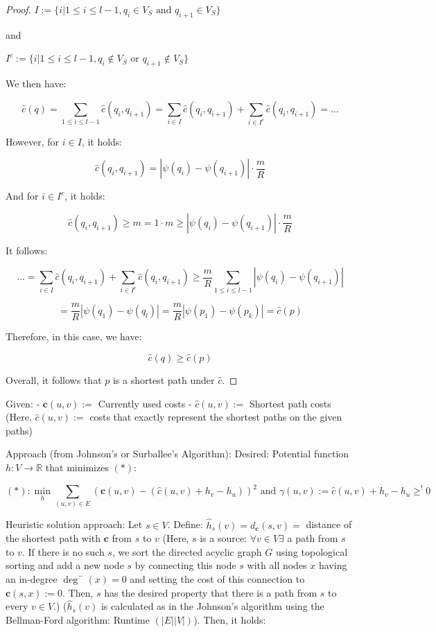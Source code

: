 \documentclass[11pt]{scrartcl}
\begin{document}
\begin{proof}
$I := \{i| 1 \le i \le l-1, q_i \in V_S \text{ and } q_{i+1} \in V_S\}$

and

$I^c := \{i| 1 \le i \le l-1, q_i \notin V_S \text{ or } q_{i+1} \notin V_S\}$

We then have:

\[
\hat{c}(q) = \sum_{1 \le i \le l-1} \hat{c}(q_i,q_{i+1}) = \sum_{i \in I} \hat{c}(q_i,q_{i+1})+\sum_{i \in I^c} \hat{c}(q_i,q_{i+1})=\ldots
\]

However, for $i \in I$, it holds:

\[
\hat{c}(q_i,q_{i+1}) = |\psi(q_i)-\psi(q_{i+1})| \cdot \frac{m}{R}
\]

And for $i \in I^c$, it holds:

\[
\hat{c}(q_i,q_{i+1}) \ge m = 1 \cdot m \ge |\psi(q_i)-\psi(q_{i+1})| \cdot \frac{m}{R}
\]

It follows:

\[
\ldots=\sum_{i \in I} \hat{c}(q_i,q_{i+1})+\sum_{i \in I^c} \hat{c}(q_i,q_{i+1}) \ge \frac{m}{R} \sum_{1 \le i \le l-1}{|\psi(q_i)-\psi(q_{i+1})|}
\]

\[
=\frac{m}{R} |\psi(q_1)-\psi(q_l)|=\frac{m}{R} |\psi(p_1)-\psi(p_k)| = \hat{c}(p)
\]

Therefore, in this case, we have:

\[
\hat{c}(q) \ge \hat{c}(p)
\]

Overall, it follows that $p$ is a shortest path under $\hat{c}$.
\end{proof}

\hrulefill

Given:
- $\mathbf{c}(u,v):=$ Currently used costs
- $\hat{c}(u,v):=$ Shortest path costs
   (Here, $\hat{c}(u,v):=$ costs that exactly represent the shortest paths on the given paths)

Approach (from Johnson's or Surballee's Algorithm):
Desired: Potential function $h: V \rightarrow \mathbb{R}$ that minimizes $(*):$

$$ (*): \min_{h} \sum_{(u,v) \in E} (\mathbf{c}(u,v)-(\hat{c}(u,v)+h_v-h_u))^2 \text{ and } \gamma(u,v):= \hat{c}(u,v) + h_v-h_u\ge^! 0$$

Heuristic solution approach:
Let $s \in V$. Define: $\hat{h}_s(v) = d_{\mathbf{c}}(s,v) = $ distance of the shortest path with $\mathbf{c}$ from $s$ to $v$ (Here, $s$ is a source: $\forall v \in V \exists$ a path from $s$ to $v$. If there is no such $s$, we sort the directed acyclic graph $G$ using topological sorting and add a new node $s$ by connecting this node $s$ with all nodes $x$ having an in-degree $\deg^-(x)=0$ and setting the cost of this connection to $\mathbf{c}(s,x):=0$. Then, $s$ has the desired property that there is a path from $s$ to every $v \in V$.) ($\hat{h}_s(v)$ is calculated as in the Johnson's algorithm using the Bellman-Ford algorithm: Runtime $(|E||V|)$).
Then, it holds:
\end{document}
